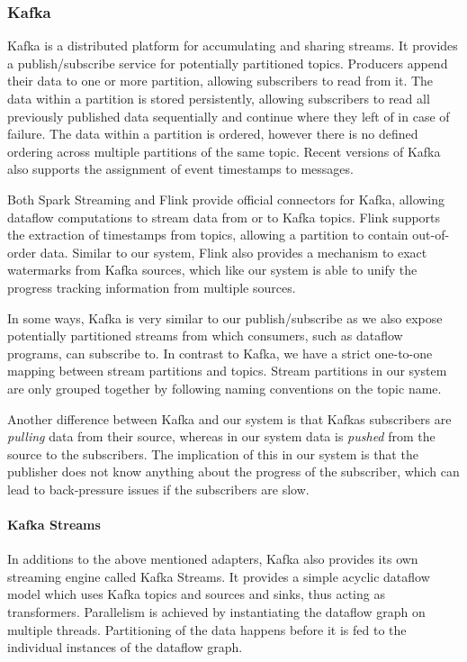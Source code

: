 \subsubsection{Kafka}

Kafka \cite{kafka} is a distributed platform for accumulating and sharing streams. It provides
a publish/subscribe service for potentially partitioned topics. Producers append
their data to one or more partition, allowing subscribers to read from it.
The data within a partition is stored persistently, allowing subscribers to
read all previously published data sequentially and continue where they left
of in case of failure. The data within a partition is ordered, however there
is no defined ordering across multiple partitions of the same topic. Recent
versions of Kafka also supports the assignment of event timestamps to messages.

Both Spark Streaming and Flink provide official connectors for Kafka, allowing
dataflow computations to stream data from or to Kafka topics. Flink supports
the extraction of timestamps from topics, allowing a partition
to contain out-of-order data. Similar to our system, Flink also provides a
mechanism to exact watermarks from Kafka sources, which like our system
is able to unify the progress tracking information from multiple sources.

In some ways, Kafka is very similar to our publish/subscribe as we also expose
potentially partitioned streams from which consumers, such as dataflow programs,
can subscribe to. In contrast to Kafka, we have a strict one-to-one mapping between stream
partitions and topics. Stream partitions in our system are only grouped together
by following naming conventions on the topic name. 
 
Another difference between Kafka and our system is that Kafkas subscribers are
\emph{pulling} data from their source, whereas in our system data is \emph{pushed}
from the source to the subscribers. The implication of this in our
system is that the publisher does not know anything about the progress of the
subscriber, which can lead to back-pressure issues if the subscribers are
slow.

\paragraph{Kafka Streams}
In additions to the above mentioned adapters, Kafka also provides its own
streaming engine called Kafka Streams. It provides a simple acyclic dataflow
model which uses Kafka topics and sources and sinks, thus acting as transformers.
Parallelism is achieved by instantiating the dataflow graph on multiple threads.
Partitioning of the data happens before it is fed to the individual instances
of the dataflow graph.

